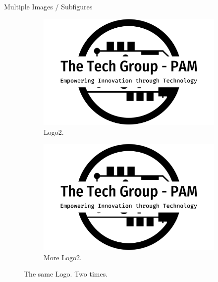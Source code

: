 \documentclass{beamer}
\begin{document}
\begin{frame}{Multiple Images / Subfigures}
  \begin{figure}[h!]
    \centering
    \begin{subfigure}[b]{0.4\linewidth}
      \includegraphics[width=\linewidth]{../images/the-tech-group-pam-high-resolution-logo-black-on-transparent-background_01.png}
      \caption{Logo2.}
    \end{subfigure}
    \begin{subfigure}[b]{0.4\linewidth}
      \includegraphics[width=\linewidth]{../images/the-tech-group-pam-high-resolution-logo-black-on-transparent-background_01.png}
      \caption{More Logo2.}
    \end{subfigure}
    \caption{The same Logo. Two times.}
    \label{fig:logo2}
  \end{figure}
\end{frame}
\end{document}
